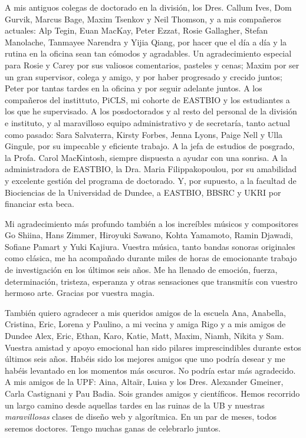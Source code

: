 A mis antiguos colegas de doctorado en la división, los Dres. Callum Ives, Dom Gurvik, Marcus Bage, Maxim Tsenkov y Neil Thomson, y a mis compañeros actuales: Alp Tegin, Euan MacKay, Peter Ezzat, Rosie Gallagher, Stefan Manolache, Tanmayee Narendra y Yijia Qiang, por hacer que el día a día y la rutina en la oficina sean tan cómodos y agradables. Un agradecimiento especial para Rosie y Carey por sus valiosos comentarios, pasteles y cenas; Maxim por ser un gran supervisor, colega y amigo, y por haber progresado y crecido juntos; Peter por tantas tardes en la oficina y por seguir adelante juntos. A los compañeros del instittuto, PiCLS, mi cohorte de EASTBIO y los estudiantes a los que he supervisado. A los posdoctorados y al resto del personal de la división e instituto, y al maravilloso equipo administrativo y de secretaría, tanto actual como pasado: Sara Salvaterra, Kirsty Forbes, Jenna Lyons, Paige Nell y Ulla Gingule, por su impecable y eficiente trabajo. A la jefa de estudios de posgrado, la Profa. Carol MacKintosh, siempre dispuesta a ayudar con una sonrisa. A la administradora de EASTBIO, la Dra. Maria Filippakopoulou, por su amabilidad y excelente gestión del programa de doctorado. Y, por supuesto, a la facultad de Biociencias de la Universidad de Dundee, a EASTBIO, BBSRC y UKRI por financiar esta beca.

Mi agradecimiento más profundo también a los increíbles músicos y compositores Go Shiina, Hans Zimmer, Hiroyuki Sawano, Kohta Yamamoto, Ramin Djawadi, Sofiane Pamart y Yuki Kajiura. Vuestra música, tanto bandas sonoras originales como clásica, me ha acompañado durante miles de horas de emocionante trabajo de investigación en los últimos seis años. Me ha llenado de emoción, fuerza, determinación, tristeza, esperanza y otras sensaciones que transmitís con vuestro hermoso arte. Gracias por vuestra magia.

\newpage

También quiero agradecer a mis queridos amigos de la escuela Ana, Anabella, Cristina, Eric, Lorena y Paulino, a mi vecina y amiga Rigo y a mis amigos de Dundee Alex, Eric, Ethan, Karo, Katie, Matt, Maxim, Niamh, Nikita y Sam. Vuestra amistad y apoyo emocional han sido pilares imprescindibles durante estos últimos seis años. Habéis sido los mejores amigos que uno podría desear y me habéis levantado en los momentos más oscuros. No podría estar más agradecido. A mis amigos de la UPF: Aina, Altaïr, Luisa y los Dres. Alexander Gmeiner, Carla Castignani y Pau Badia. Sois grandes amigos y científicos. Hemos recorrido un largo camino desde aquellas tardes en las ruinas de la UB y nuestras \textit{maravillosas} clases de diseño web y algorítmica. En un par de meses, todos seremos doctores. Tengo muchas ganas de celebrarlo juntos.

